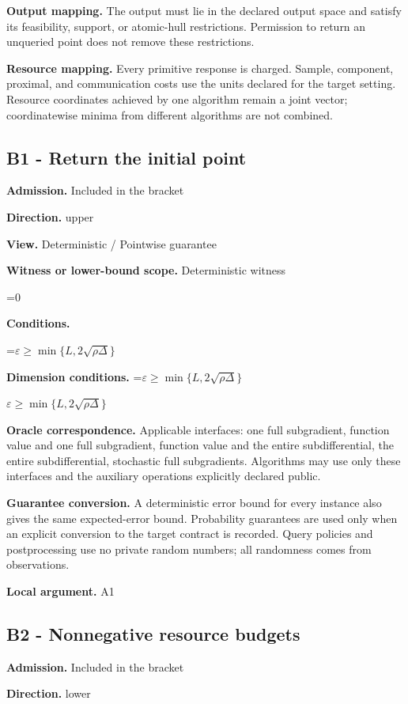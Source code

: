 \documentclass[10pt,a4paper]{article}
\newcommand{\AtlasMath}[1]{\par\begingroup\centering\setbox0=\hbox{$\displaystyle #1$}\ifdim\wd0>1.4\linewidth\typeout{ATLAS WIDE FORMULA: \the\wd0}\fi\ifdim\wd0>\linewidth\resizebox{\linewidth}{!}{\box0}\else\box0\fi\par\endgroup}
\newcommand{\AtlasInlineMath}[1]{\begingroup\setbox0=\hbox{$#1$}\ifdim\wd0>.4\linewidth\endgroup\AtlasMath{#1}\else\endgroup$#1$\fi}
\begin{document}
\textbf{Output mapping.} The output must lie in the declared output space and satisfy its feasibility, support, or atomic-hull restrictions. Permission to return an unqueried point does not remove these restrictions.

\textbf{Resource mapping.} Every primitive response is charged. Sample, component, proximal, and communication costs use the units declared for the target setting. Resource coordinates achieved by one algorithm remain a joint vector; coordinatewise minima from different algorithms are not combined.

\subsection{B1 - Return the initial point}
\textbf{Admission.} Included in the bracket

\textbf{Direction.} upper

\textbf{View.} Deterministic / Pointwise guarantee

\textbf{Witness or lower-bound scope.} Deterministic witness

\AtlasMath{0}
\textbf{Conditions.} 
\AtlasMath{\varepsilon\ge\min\{L,2\sqrt{\rho\Delta}\}}


\textbf{Dimension conditions.} \AtlasInlineMath{\varepsilon\ge\min\{L,2\sqrt{\rho\Delta}\}}

\textbf{Oracle correspondence.} Applicable interfaces: one full subgradient, function value and one full subgradient, function value and the entire subdifferential, the entire subdifferential, stochastic full subgradients. Algorithms may use only these interfaces and the auxiliary operations explicitly declared public.

\textbf{Guarantee conversion.} A deterministic error bound for every instance also gives the same expected-error bound. Probability guarantees are used only when an explicit conversion to the target contract is recorded. Query policies and postprocessing use no private random numbers; all randomness comes from observations.

\textbf{Local argument.} A1

\subsection{B2 - Nonnegative resource budgets}
\textbf{Admission.} Included in the bracket

\textbf{Direction.} lower
\end{document}
